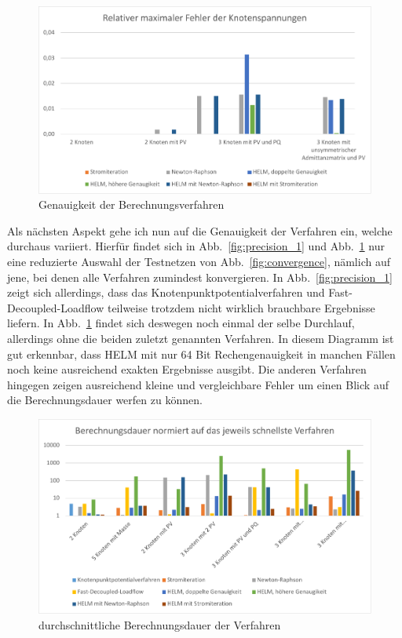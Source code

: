 \documentclass[12pt,a4paper]{article}
\newcommand{\reffig}[1]{{Abb.~\ref{#1}}}
\begin{document}
	\begin{figure}
		\centering
		\includegraphics[scale=0.8]{pictures/precision_2}
		\caption{Genauigkeit der Berechnungsverfahren}
		\label{fig:precision_2}
	\end{figure}
	
	Als nächsten Aspekt gehe ich nun auf die Genauigkeit der Verfahren ein, welche durchaus variiert. Hierfür findet sich in \reffig{fig:precision_1} und \reffig{fig:precision_2} nur eine reduzierte Auswahl der Testnetzen von \reffig{fig:convergence}, nämlich auf jene, bei denen alle Verfahren zumindest konvergieren. In \reffig{fig:precision_1} zeigt sich allerdings, dass das Knotenpunktpotentialverfahren und Fast-Decoupled-Loadflow teilweise trotzdem nicht wirklich brauchbare Ergebnisse liefern. In \reffig{fig:precision_2} findet sich deswegen noch einmal der selbe Durchlauf, allerdings ohne die beiden zuletzt genannten Verfahren. In diesem Diagramm ist gut erkennbar, dass HELM mit nur 64 Bit Rechengenauigkeit in manchen Fällen noch keine ausreichend exakten Ergebnisse ausgibt. Die anderen Verfahren hingegen zeigen ausreichend kleine und vergleichbare Fehler um einen Blick auf die Berechnungsdauer werfen zu können.
	
	\begin{figure}
		\centering
		\includegraphics[scale=0.8]{pictures/duration_mean}
		\caption{durchschnittliche Berechnungsdauer der Verfahren}
		\label{fig:duration_mean}
	\end{figure}
	
\end{document}
